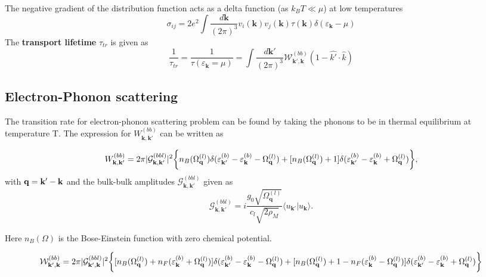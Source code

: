 \documentclass{article}
\begin{document}
The negative gradient of the distribution function acts as a delta function (as $k_BT \ll \mu$) at low temperatures
\begin{equation}
	\sigma_{ij} = 2e^2 \int \frac{d\mathbf{k}}{(2\pi)^3} v_i(\mathbf{k}) v_j(\mathbf{k}) 
	\tau(\mathbf{k}) \delta(\varepsilon_\mathbf{k} -\mu) \label{Eqn:Cond}
\end{equation}
The \textbf{transport lifetime} $\tau_{tr}$ is given as
\begin{equation}
	\frac{1}{\tau_{tr}}= \frac{1}{\tau (\varepsilon_\mathbf{k} = \mu)} = \int \frac{d\mathbf{k'}}{(2\pi)^3} \mathcal{W}_{\mathbf{k'},\mathbf{k}}^{(bb)} (1 - \hat{k'} \cdot \hat{k}  ) \label{Eqn:transport_lifetime}
\end{equation}





\subsection{Electron-Phonon scattering}
The transition rate for electron-phonon scattering problem can be found by taking the phonons to be in thermal equilibrium at temperature T. The expression for   $W_{\mathbf{k},\mathbf{k'}}^{(bb)}$ can be written as

	\begin{equation}
		W_{\mathbf{k},\mathbf{k'}}^{(bb)} = 2\pi |{\mathcal{G}_{\mathbf{k},\mathbf{k}'}^{(bbl)}}|^2 \bigg{\{} n_B(\Omega_\mathbf{q} ^{(l)})  \delta (\varepsilon_\mathbf{k'} ^{(b)} - \varepsilon_\mathbf{k} ^{(b)}- \Omega_\mathbf{q} ^{(l)}) + [n_B(\Omega_\mathbf{q} ^{(l)}) + 1] \delta (\varepsilon_\mathbf{k'} ^{(b)} - \varepsilon_\mathbf{k} ^{(b)}+ \Omega_\mathbf{q} ^{(l)}) \bigg{\}},   \label{Eqn:e-ph-scattering-W}
	\end{equation} 
with ${\bf q} = {\bf k}' - {\bf k}$ and the bulk-bulk amplitudes ${\mathcal{G}_{\mathbf{k},\mathbf{k}'}^{(bbl)}}$ given as
\begin{equation}
	{\mathcal{G}_{\mathbf{k},\mathbf{k}'}^{(bbl)}} = i \frac{g_0 \sqrt{\Omega_\mathbf{q} ^{{(l)}}}}{c_l \sqrt{2\rho_M}} \langle u_{\mathbf{k'}} | u_{\mathbf{k}} \rangle . \label{Eqn:scattering_matrix2}
\end{equation}


Here $n_B(\Omega)$ is the Bose-Einstein function with zero chemical potential. 

	\begin{equation}
		\mathcal{W}_{\mathbf{k',k}}^{(bb)} = 2\pi |\mathcal{G}_{\mathbf{k',k}} ^{(bbl)}|^2 \bigg{\{} [n_B(\Omega_\mathbf{q} ^{(l)}) + n_F(\varepsilon_{\mathbf{k}} ^{(b)} + \Omega_\mathbf{q} ^{(l)})] \delta (\varepsilon_\mathbf{k'} ^{(b)} - \varepsilon_\mathbf{k} ^{(b)}- \Omega_\mathbf{q} ^{(l)}) + [n_B(\Omega_\mathbf{q} ^{(l)}) + 1- n_F(\varepsilon_{\mathbf{k}} ^{(b)} - \Omega_\mathbf{q} ^{(l)})] \delta (\varepsilon_\mathbf{k'} ^{(b)} - \varepsilon_\mathbf{k} ^{(b)}+ \Omega_\mathbf{q} ^{(l)}) \bigg{\}} \label{Eqn:e-ph-scattering-stylishW}
	\end{equation}


	
\end{document}
